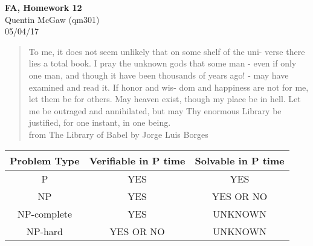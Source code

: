 \documentclass[11pt]{article}
\begin{document}
\begin{center} {\Large\bf FA, Homework 12} \\ Quentin McGaw (qm301) \\ 05/04/17
\end{center}

\begin{quote}
To me, it does not seem unlikely that on some shelf of the uni-
verse there lies a total book. I pray the unknown gods that some
man - even if only one man, and though it have been thousands
of years ago! - may have examined and read it. If honor and wis-
dom and happiness are not for me, let them be for others. May
heaven exist, though my place be in hell. Let me be outraged
and annihilated, but may Thy enormous Library be justified, for
one instant, in one being.
\\ from The Library of Babel by Jorge Luis Borges
\end{quote}

\begin{center}
    \begin{tabular}{|c | c | c |} 
    \hline
    Problem Type & Verifiable in P time & Solvable in P time \\
    \hline
    P & YES & YES \\
    \hline
    NP & YES & YES OR NO \\
    \hline
    NP-complete & YES & UNKNOWN \\
    \hline
    NP-hard & YES OR NO & UNKNOWN \\
    \hline
    \end{tabular}
\end{center}
\end{document}
